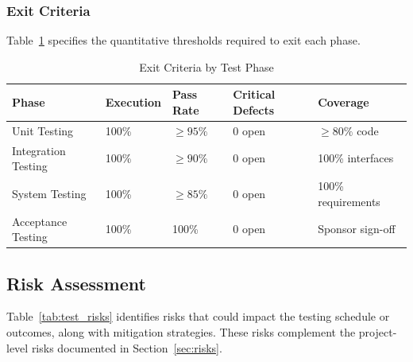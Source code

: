 \subsubsection{Exit Criteria}

Table~\ref{tab:exit_criteria} specifies the quantitative thresholds required to exit each phase.

\begin{table}[H]
    \centering
    \caption{Exit Criteria by Test Phase}
    \label{tab:exit_criteria}
    \begin{tabular}{@{}lllll@{}}
        \toprule
        \textbf{Phase} & \textbf{Execution} & \textbf{Pass Rate} & \textbf{Critical Defects} & \textbf{Coverage} \\
        \midrule
        Unit Testing & 100\% & $\geq 95\%$ & 0 open & $\geq 80\%$ code \\
        Integration Testing & 100\% & $\geq 90\%$ & 0 open & 100\% interfaces \\
        System Testing & 100\% & $\geq 85\%$ & 0 open & 100\% requirements \\
        Acceptance Testing & 100\% & 100\% & 0 open & Sponsor sign-off \\
        \bottomrule
    \end{tabular}
\end{table}

\subsection{Risk Assessment}

Table~\ref{tab:test_risks} identifies risks that could impact the testing schedule or outcomes, along with mitigation strategies. These risks complement the project-level risks documented in Section~\ref{sec:risks}.

